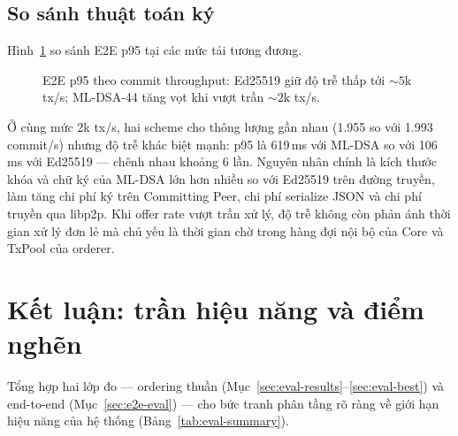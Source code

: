 \subsection{So sánh thuật toán ký}
\label{sec:e2e-crypto-compare}

Hình~\ref{fig:e2e-latency-compare} so sánh E2E p95 tại các mức tải tương
đương.

\begin{figure}[H]
\centering
{}
\caption{E2E p95 theo commit throughput: Ed25519 giữ độ trễ thấp tới ${\sim}5$k tx/s;
ML-DSA-44 tăng vọt khi vượt trần ${\sim}2$k tx/s.}
\label{fig:e2e-latency-compare}
\end{figure}

Ở cùng mức 2k tx/s, hai scheme cho thông lượng gần nhau (1.955 so với 1.993
commit/s) nhưng độ trễ khác biệt mạnh: p95 là 619\,ms với ML-DSA so với
106\,ms với Ed25519 --- chênh nhau khoảng 6 lần. Nguyên nhân chính là kích
thước khóa và chữ ký của ML-DSA lớn hơn nhiều so với Ed25519 trên đường
truyền, làm tăng chi phí ký trên Committing Peer, chi phí serialize JSON và
chi phí truyền qua libp2p. Khi offer rate vượt trần xử lý, độ trễ không còn
phản ánh thời gian xử lý đơn lẻ mà chủ yếu là thời gian chờ trong hàng đợi
nội bộ của Core và TxPool của orderer.

\section{Kết luận: trần hiệu năng và điểm nghẽn}
\label{sec:eval-conclusion}

Tổng hợp hai lớp đo --- ordering thuần
(Mục~\ref{sec:eval-results}--\ref{sec:eval-best}) và end-to-end
(Mục~\ref{sec:e2e-eval}) --- cho bức tranh phân tầng rõ ràng về giới hạn hiệu
năng của hệ thống (Bảng~\ref{tab:eval-summary}).

